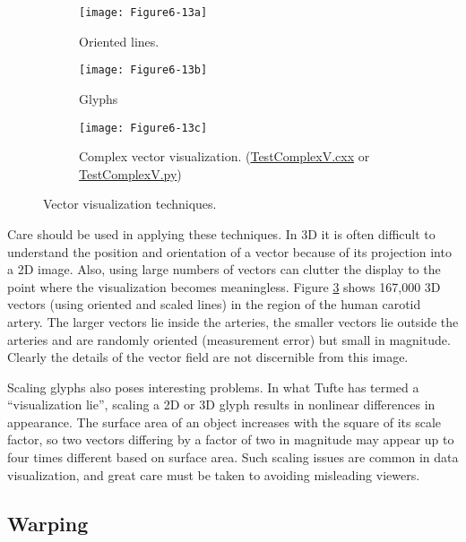 \begin{figure}[htb]
	\begin{subfigure}[h]{0.24\linewidth}
		\texttt{[image: Figure6-13a]}
		\caption{Oriented lines.}\label{fig:Figure6-13a}
	\end{subfigure}
	\hfill
	\begin{subfigure}[h]{0.24\linewidth}
		\texttt{[image: Figure6-13b]}
		\caption{Glyphs}\label{fig:Figure6-13b}
	\end{subfigure}%
	\hfill
	\begin{subfigure}[h]{0.48\linewidth}
		\texttt{[image: Figure6-13c]}
		\caption{Complex vector visualization. (\href{https://lorensen.github.io/VTKExamples/site/Cxx/Visualization/TestComplexV}{TestComplexV.cxx} or \href{https://lorensen.github.io/VTKExamples/site/Python/Visualization/TestComplexV/}{TestComplexV.py})}\label{fig:Figure6-13c}
	\end{subfigure}
	\caption{Vector visualization techniques.}\label{fig:Figure6-13}
\end{figure}

Care should be used in applying these techniques. In 3D it is often difficult to understand the position and orientation of a vector because of its projection into a 2D image. Also, using large numbers of vectors can clutter the display to the point where the visualization becomes meaningless. Figure \ref{fig:Figure6-13c} shows 167,000 3D vectors (using oriented and scaled lines) in the region of the human carotid artery. The larger vectors lie inside the arteries, the smaller vectors lie outside the arteries and are randomly oriented (measurement error) but small in magnitude. Clearly the details of the vector field are not discernible from this image.

Scaling glyphs also poses interesting problems. In what Tufte has termed a ``visualization lie'', \cite{Tufte83} scaling a 2D or 3D glyph results in nonlinear differences in appearance. The surface area of an object increases with the square of its scale factor, so two vectors differing by a factor of two in magnitude may appear up to four times different based on surface area. Such scaling issues are common in data visualization, and great care must be taken to avoiding misleading viewers.

\subsection{Warping}

